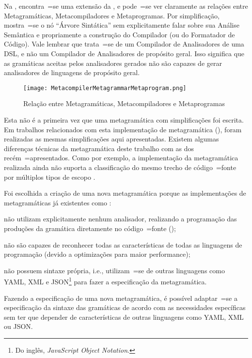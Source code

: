 Na ,
encontra~=se uma extensão da ,
e pode~=se ver claramente as relações entre Metagramáticas,
Metacompiladores e Metaprogramas. Por simplificação,
mostra~=se o nó ``Árvore Sintática'' sem explicitamente falar sobre sua Análise Semântica e
propriamente a construção do Compilador (ou do Formatador de Código).
Vale lembrar que trata~=se de um Compilador de Analisadores de uma DSL,
e não um Compilador de Analisadores de propósito geral.
Isso significa que as gramáticas aceitas pelos analisadores gerados não são capazes de gerar analisadores de linguagens de propósito geral.
\begin{figure}[!htb]
\caption{Relação entre Metagramáticas, Metacompiladores e Metaprogramas}
\label{MetacompilerMetagrammarMetaprogram}
\centering
\texttt{[image: MetacompilerMetagrammarMetaprogram.png]}
\end{figure}

Esta não é a primeira vez que uma metagramática com simplificações foi escrita.
Em trabalhos relacionados com esta implementação de metagramática (),
foram realizadas as mesmas simplificações aqui apresentadas.
Existem algumas diferenças técnicas da metagramática deste trabalho com as dos recém~=apresentados.
Como por exemplo,
a implementação da metagramática realizada ainda não suporta a classificação do mesmo trecho de código~=fonte por múltiplos tipos de escopo \cite{vsCodeSyntaxHighlighthing}.

Foi escolhida a criação de uma nova metagramática porque as implementações de metagramáticas já existentes como :
\begin{inparaenum}[1)]
\item não utilizam explicitamente nenhum analisador,
realizando a programação das produções da gramática diretamente no código~=fonte ();
\item não são capazes de reconhecer todas as características de todas as linguagens de programação (devido a optimizações para maior performance);
\item não possuem sintaxe própria,
i.e.,
utilizam~=se de outras linguagens como YAML,
XML e JSON\footnote{%
Do inglês,
\textit{JavaScript Object Notation}.
} \cite{foundationsOfJSONSchema} para fazer a especificação da metagramática.
\end{inparaenum}
Fazendo a especificação de uma nova metagramática,
é possível adaptar~=se a especificação da sintaxe das gramáticas de acordo com as necessidades específicas sem ter que depender de características de outras linguagens como YAML,
XML ou
JSON.

